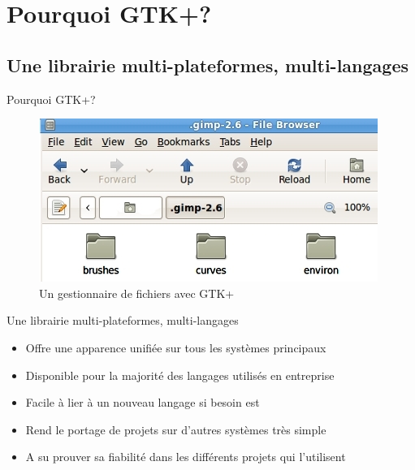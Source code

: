 \documentclass{beamer}
\begin{document}
 \section{Pourquoi GTK+?}
  \subsection{Une librairie multi-plateformes, multi-langages}
  \begin{frame}{Pourquoi GTK+?}
    \begin{figure}[htb]
    \centering
    \includegraphics[scale=0.6]{"gtkplus"}
    \caption{Un gestionnaire de fichiers avec GTK+}
    \label{fig:gtk}
    \end{figure}
  \end{frame}
  \begin{frame}{Une librairie multi-plateformes, multi-langages}
  \begin{itemize}
    \item Offre une apparence unifiée sur tous les systèmes principaux\\
    \item Disponible pour la majorité des langages utilisés en entreprise\\
    \item Facile à lier à un nouveau langage si besoin est\\
    \item Rend le portage de projets sur d'autres systèmes très simple\\
    \item A su prouver sa fiabilité dans les différents projets qui l'utilisent
  \end{itemize}
  \end{frame}
\end{document}
